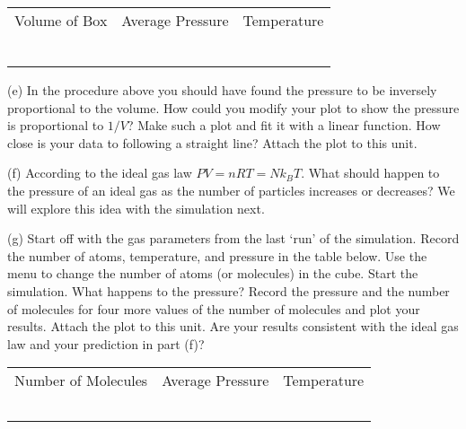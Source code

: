 \vspace{0.3cm}
{\renewcommand{\arraystretch}{1.2}
{\centering \begin{tabular}{|C{1.3in}|C{1.3in}|C{1.3in}|}
\hline 
Volume of Box &
Average Pressure &
Temperature \\
\hhline{|=|=|=|}
& &
\\
\hline 
& &
\\
\hline 
& &
\\
\hline 
& &
\\
\hline 
& &
\\
\hline 
& &
\\
\hline
\end{tabular}\par}}
\vspace{0.3cm}

(e) In the procedure above you should have found the pressure to be inversely
proportional to the volume. How could you modify your plot to show
the pressure is proportional to \( 1/V \)? Make such a plot and fit it with a 
linear function. How close is your data to following a straight line? Attach 
the plot to this unit.
\vspace{1.4in}

(f) According to the ideal gas law \( PV = nRT = Nk_{B}T \). What
should happen to the pressure of an ideal gas as the number of particles
increases or decreases?
We will explore this idea with the simulation next.
\vspace{1.4in}

(g) Start off with the gas parameters from the last `run' of the 
simulation.
Record the number of atoms, temperature, and pressure in the table below.
Use the  menu to change the number of atoms (or molecules) in the cube.
Start
the simulation. What happens to the pressure? Record the pressure
and the number of molecules for four more values of the number of
molecules and plot your results. Attach the plot to this unit. Are your results consistent with
the ideal gas law and your prediction in part (f)?
\vspace{1.5in}

\vspace{0.3cm}
{\renewcommand{\arraystretch}{1.2}
{\centering \begin{tabular}{|C{1.5in}|C{1.3in}|C{1.3in}|}
\hline 
Number of Molecules&
Average Pressure&
Temperature\\
\hhline{|=|=|=|}
& &
\\
\hline 
& &
\\
\hline 
& &
\\
\hline 
& &
\\
\hline 
& &
\\
\hline
\end{tabular}\par}}
\vspace{0.3cm}

